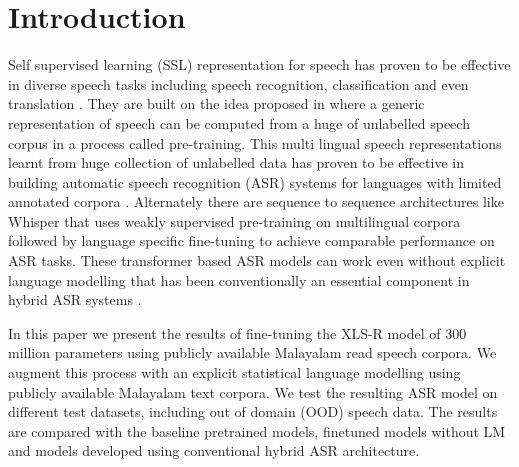 \documentclass[runningheads]{llncs}
\begin{document}
\section{Introduction}

Self supervised learning (SSL)  representation for speech has proven to be effective in diverse speech tasks including speech recognition, classification and even translation \cite{baevski2020wav2vec,babu2021xls,barrault2023seamlessm4t}.  They are built on the idea proposed in \cite{schneider2019wav2vec} where a generic representation of speech can be computed from a huge of unlabelled speech corpus in a process called pre-training. This multi lingual speech representations learnt from huge collection of unlabelled data has proven to be effective in building automatic speech recognition (ASR) systems for languages with limited annotated corpora \cite{conneau2020unsupervised}. Alternately there are sequence to sequence architectures like Whisper \cite{whisper} that uses weakly supervised pre-training on multilingual corpora followed by language specific fine-tuning to achieve comparable performance on ASR tasks. These transformer based ASR models can work even without explicit language modelling that has been conventionally an essential component in hybrid ASR systems \cite{manohar2023automatic}.

In this paper we present the results of fine-tuning the XLS-R model \cite{babu2021xls} of 300 million parameters using publicly available Malayalam read speech corpora. We augment this process with an explicit statistical language modelling using publicly available Malayalam text corpora. We test the resulting ASR model on different test datasets, including out of domain (OOD) speech data. The results are compared with the baseline pretrained models, finetuned models without LM and models developed using conventional hybrid ASR architecture.




\end{document}
